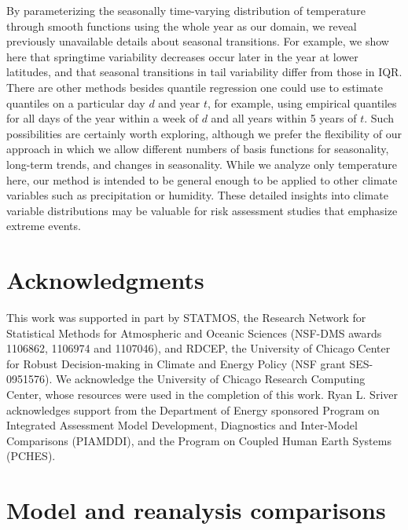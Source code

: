 \documentclass{ametsoc}
\begin{document}
By parameterizing the seasonally time-varying distribution of temperature through smooth functions using the whole year as our domain, we reveal previously unavailable details  about seasonal transitions. For example, we show here that springtime variability decreases occur later in the year at lower latitudes, and that seasonal transitions in tail variability differ from those in IQR. There are other methods besides quantile regression one could use to estimate quantiles on a particular day $d$ and year $t$, for example, using empirical quantiles for all days of the year within a week of $d$ and all years within 5 years of $t$. Such possibilities are certainly worth exploring, although we prefer the flexibility of our approach in which we allow different numbers of basis functions for seasonality, long-term trends, and changes in seasonality. While we analyze only temperature here, our method is intended to be general enough to be applied to other climate variables such as precipitation or humidity.
These detailed insights into climate variable distributions may be valuable for risk assessment studies that emphasize extreme events.

\section*{Acknowledgments}
This work was supported in part by STATMOS, the Research Network for Statistical Methods for
Atmospheric and Oceanic Sciences (NSF-DMS awards 1106862,
1106974 and 1107046), and RDCEP, the University of Chicago
Center for Robust Decision-making in Climate and Energy Policy
(NSF grant SES-0951576). We acknowledge the University of Chicago
Research  Computing  Center,  whose  resources  were  used  in  the
completion of this work. Ryan L. Sriver acknowledges support from the Department of Energy sponsored Program on Integrated Assessment Model Development, Diagnostics and Inter-Model Comparisons (PIAMDDI), and the Program on Coupled Human Earth Systems (PCHES).

\newpage
\appendix

\section{Model and reanalysis comparisons}
\label{app:moments}
\end{document}
